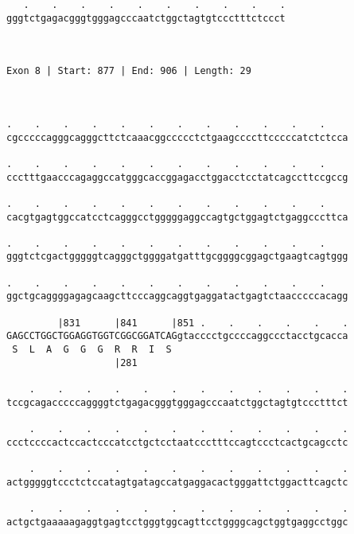 \documentclass{article}
\begin{document}
\begin{Verbatim}
   .    .    .    .    .    .    .    .    .    .
gggtctgagacgggtgggagcccaatctggctagtgtccctttctccct
                                                 
                                                 
 
Exon 8 | Start: 877 | End: 906 | Length: 29



.    .    .    .    .    .    .    .    .    .    .    .    
cgcccccagggcagggcttctcaaacggccccctctgaagccccttcccccatctctcca
                                                            
.    .    .    .    .    .    .    .    .    .    .    .    
ccctttgaacccagaggccatgggcaccggagacctggacctcctatcagccttccgccg
                                                            
.    .    .    .    .    .    .    .    .    .    .    .    
cacgtgagtggccatcctcagggcctgggggaggccagtgctggagtctgaggcccttca
                                                            
.    .    .    .    .    .    .    .    .    .    .    .    
gggtctcgactgggggtcagggctggggatgatttgcggggcggagctgaagtcagtggg
                                                            
.    .    .    .    .    .    .    .    .    .    .    .    
ggctgcaggggagagcaagcttcccaggcaggtgaggatactgagtctaacccccacagg
                                                            
         |831      |841      |851 .    .    .    .    .    .
GAGCCTGGCTGGAGGTGGTCGGCGGATCAGgtacccctgccccaggccctacctgcacca
 S  L  A  G  G  G  R  R  I  S                               
                   |281                                     
  
    .    .    .    .    .    .    .    .    .    .    .    .
tccgcagacccccaggggtctgagacgggtgggagcccaatctggctagtgtccctttct
                                                            
    .    .    .    .    .    .    .    .    .    .    .    .
ccctccccactccactcccatcctgctcctaatccctttccagtccctcactgcagcctc
                                                            
    .    .    .    .    .    .    .    .    .    .    .    .
actgggggtccctctccatagtgatagccatgaggacactgggattctggacttcagctc
                                                            
    .    .    .    .    .    .    .    .    .    .    .    .
actgctgaaaaagaggtgagtcctgggtggcagttcctggggcagctggtgaggcctggc
                                                            

\end{Verbatim}
\end{document}
